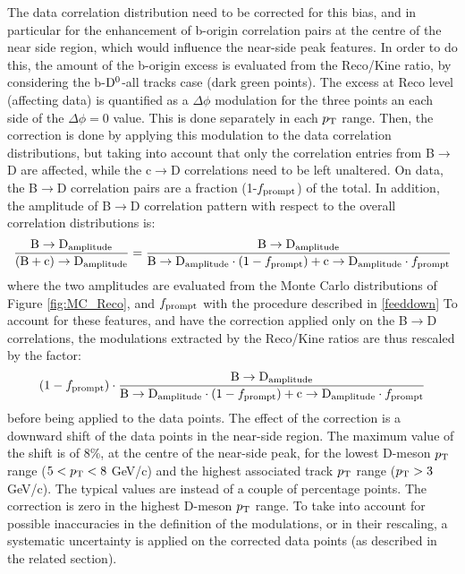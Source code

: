 The data correlation distribution need to be corrected for this bias, and in particular for the enhancement of b-origin correlation pairs at the centre of the near side region, which would influence the near-side peak features.
In order to do this, the amount of the b-origin excess is evaluated from the Reco/Kine ratio, by considering the b-${\rm D^0}$-all tracks case (dark green points). The excess at Reco level (affecting data) is quantified as a $\Delta\phi$ modulation for the three points an each side of the $\Delta\phi = 0$ value. This is done separately in each $p_{\rm T}$ range.
Then, the correction is done by applying this modulation to the data correlation distributions, but taking into account that only the correlation entries from B$\rightarrow$D are affected, while the c$\rightarrow$D correlations need to be left unaltered.
On data, the B$\rightarrow$D correlation pairs are a fraction (1-$f_{\rm prompt}$) of the total.
In addition, the amplitude of B$\rightarrow$D correlation pattern with respect to the overall correlation distributions is:
\begin{equation}
\frac{{\rm B}\rightarrow{\rm D}_{\rm amplitude}}{({\rm B+c})\rightarrow{\rm D}_{\rm amplitude}} = \frac{{\rm B}\rightarrow{\rm D}_{\rm amplitude}}{{\rm B}\rightarrow{\rm D}_{\rm amplitude} \cdot (1-f_{\rm prompt}) + {\rm c}\rightarrow{\rm D}_{\rm amplitude} \cdot f_{\rm prompt}}
\end{equation}
where the two amplitudes are evaluated from the Monte Carlo distributions of Figure \ref{fig:MC_Reco}, and $f_{\rm prompt}$ with the procedure described in \ref{feeddown}
To account for these features, and have the correction applied only on the B$\rightarrow$D correlations, the modulations extracted by the Reco/Kine ratios are thus rescaled by the factor:
\begin{equation}
(1 - f_{\rm prompt}) \cdot \frac{{\rm B}\rightarrow{\rm D}_{\rm amplitude}}{{\rm B}\rightarrow{\rm D}_{\rm amplitude} \cdot (1-f_{\rm prompt}) + {\rm c}\rightarrow{\rm D}_{\rm amplitude} \cdot f_{\rm prompt}}
\end{equation}
before being applied to the data points. The effect of the correction is a downward shift of the data points in the near-side region. The maximum value of the shift is of 8\%, at the centre of the near-side peak, for the lowest D-meson $p_{\rm T}$ range ($5 < p_{\rm T} < 8$ GeV/c) and the highest associated track $p_{\rm T}$ range ($p_{\rm T} > 3$ GeV/c). The typical values are instead of a couple of percentage points. The correction is zero in the highest D-meson $p_{\rm T}$ range.
To take into account for possible inaccuracies in the definition of the modulations, or in their rescaling, a systematic uncertainty is  applied on the corrected data points (as described in the related section).

\clearpage
%
